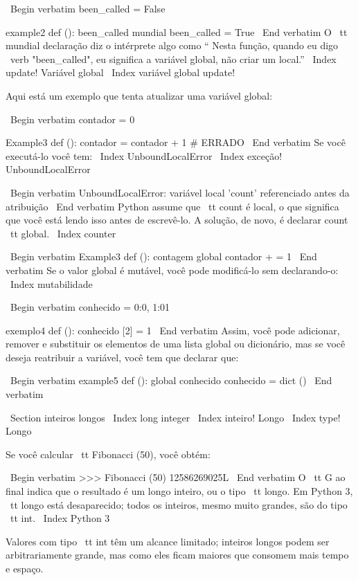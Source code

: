 \documentclass[10pt]{book}
\begin{document}
\begin {itemize}
{{{{{{{\ Begin {verbatim}
been_called = False

example2 def ():
    been_called mundial 
    been_called = True
\ End {verbatim}
%
O {\ tt mundial} declaração diz o intérprete
algo como `` Nesta função, quando eu digo \ verb "been_called", eu
significa a variável global, não criar um local.''
\ Index {update! Variável global}
\ Index {variável global update!}

Aqui está um exemplo que tenta atualizar uma variável global:

\ Begin {verbatim}
contador = 0

Example3 def ():
    contador = contador + 1 # ERRADO
\ End {verbatim}
%
Se você executá-lo você tem:
\ Index {} UnboundLocalError
\ Index {exceção! UnboundLocalError}

\ Begin {verbatim}
UnboundLocalError: variável local 'count' referenciado antes da atribuição
\ End {verbatim}
%
Python assume que {\ tt count} é local, o que significa
que você está lendo isso antes de escrevê-lo. A solução, de novo,
é declarar {count \ tt} global.
\ Index {counter}

\ Begin {verbatim}
Example3 def ():
    contagem global
    contador + = 1
\ End {verbatim}
%
Se o valor global é mutável, você pode modificá-lo sem
declarando-o:
\ Index {} mutabilidade

\ Begin {verbatim}
conhecido = {0:0, 1:01}

exemplo4 def ():
    conhecido [2] = 1
\ End {verbatim}
%
Assim, você pode adicionar, remover e substituir os elementos de uma lista global ou
dicionário, mas se você deseja reatribuir a variável, você
tem que declarar que:

\ Begin {verbatim}
example5 def ():
    global conhecido
    conhecido = dict ()
\ End {verbatim}
%

\ Section {inteiros longos}
\ Index {long integer}
\ Index {inteiro! Longo}
\ Index {type! Longo}

Se você calcular {\ tt Fibonacci (50)}, você obtém:

\ Begin {verbatim}
>>> Fibonacci (50)
12586269025L
\ End {verbatim}
%
O {\ tt G} ao final indica que o resultado é um longo
inteiro, ou o tipo {\ tt longo}. Em Python 3, {\ tt longo} está desaparecido; todos os inteiros,
mesmo muito grandes, são do tipo {\ tt int}.
\ Index {Python 3}

Valores com tipo {\ tt int} têm um alcance limitado;
inteiros longos podem ser arbitrariamente grande, mas como eles ficam maiores
que consomem mais tempo e espaço.

}}}}}}}
\end{itemize}
\end{document}
